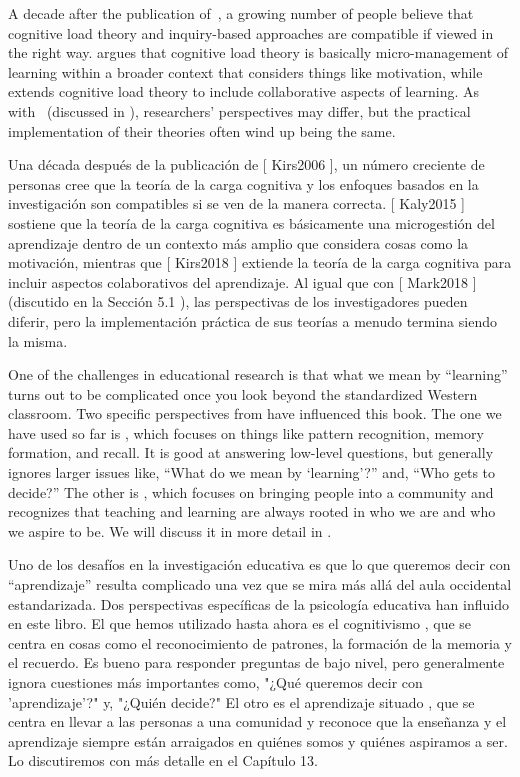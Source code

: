 {A decade after the publication of~\cite{Kirs2006},
a growing number of people believe that cognitive load theory and inquiry-based approaches are compatible
if viewed in the right way.
\cite{Kaly2015} argues that cognitive load theory is basically micro-management of learning
within a broader context that considers things like motivation,
while~\cite{Kirs2018} extends cognitive load theory to include collaborative aspects of learning.
As with~\cite{Mark2018} (discussed in ),
researchers' perspectives may differ,
but the practical implementation of their theories often wind up being the same.

Una década después de la publicación de [ Kirs2006 ], un número creciente de personas cree que la teoría de la carga cognitiva y los enfoques basados ​​en la investigación son compatibles si se ven de la manera correcta. [ Kaly2015 ] sostiene que la teoría de la carga cognitiva es básicamente una microgestión del aprendizaje dentro de un contexto más amplio que considera cosas como la motivación, mientras que [ Kirs2018 ] extiende la teoría de la carga cognitiva para incluir aspectos colaborativos del aprendizaje. Al igual que con [ Mark2018 ] (discutido en la Sección  5.1 ), las perspectivas de los investigadores pueden diferir, pero la implementación práctica de sus teorías a menudo termina siendo la misma.

One of the challenges in educational research is that
what we mean by ``learning'' turns out to be complicated
once you look beyond the standardized Western classroom.
Two specific perspectives from  have influenced this book.
The one we have used so far is ,
which focuses on things like pattern recognition, memory formation, and recall.
It is good at answering low-level questions,
but generally ignores larger issues like,
``What do we mean by `learning'?''
and, ``Who gets to decide?''
The other is ,
which focuses on bringing people into a community
and recognizes that
teaching and learning are always rooted in who we are and who we aspire to be.
We will discuss it in more detail in .

Uno de los desafíos en la investigación educativa es que lo que queremos decir con “aprendizaje” resulta complicado una vez que se mira más allá del aula occidental estandarizada. Dos perspectivas específicas de la psicología educativa han influido en este libro. El que hemos utilizado hasta ahora es el cognitivismo , que se centra en cosas como el reconocimiento de patrones, la formación de la memoria y el recuerdo. Es bueno para responder preguntas de bajo nivel, pero generalmente ignora cuestiones más importantes como, "¿Qué queremos decir con 'aprendizaje'?" y, "¿Quién decide?" El otro es el aprendizaje situado , que se centra en llevar a las personas a una comunidad y reconoce que la enseñanza y el aprendizaje siempre están arraigados en quiénes somos y quiénes aspiramos a ser. Lo discutiremos con más detalle en el Capítulo  13.


}
